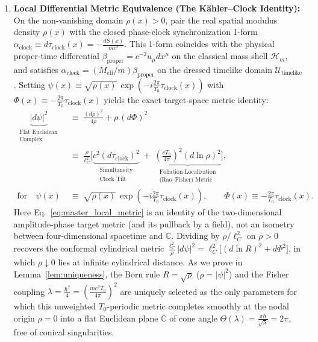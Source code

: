 \documentclass[11pt, a4paper]{article}
\theoremstyle{definition}
\begin{document}
\begin{enumerate}[label=\textbf{(\Roman*)}, leftmargin=1.2cm]
    \item \textbf{Local Differential Metric Equivalence (The K\"{a}hler--Clock Identity):} On the non-vanishing domain $\rho(x) > 0$, pair the real spatial modulus density $\rho(x)$ with the closed phase-clock synchronization 1-form $\alpha_{\text{clock}} \equiv d\tau_{\text{clock}}(x) = -\frac{dS(x)}{mc^2}$. This 1-form coincides with the physical proper-time differential $\beta_{\text{proper}} = c^{-2}u_\mu dx^\mu$ on the classical mass shell $\mathcal{H}_m$, and satisfies $\alpha_{\text{clock}} = (M_{\text{eff}}/m)\beta_{\text{proper}}$ on the dressed timelike domain $\mathcal{U}_{\text{timelike}}$. Setting $\psi(x) \equiv \sqrt{\rho(x)}\,\exp\!\left(-i\frac{2\pi}{T_0}\tau_{\text{clock}}(x)\right)$ with $\Phi(x) \equiv -\frac{2\pi}{T_0}\tau_{\text{clock}}(x)$ yields the exact target-space metric identity:
    \begin{equation}
    \label{eq:master_local_metric}
    \boxed{
    \begin{aligned}
    \underbrace{\big|d\psi\big|^2}_{\substack{\text{Flat Euclidean} \\ \text{Complex Wave Metric}}} &\;\equiv\; \frac{(d\rho)^2}{4\rho} + \rho\,(d\Phi)^2 \\
    &\;\equiv\; \frac{\rho}{\ell_C^2}\Bigg[ \underbrace{c^2 \left(d\tau_{\text{clock}}\right)^2}_{\substack{\text{Simultaneity} \\ \text{Clock Tilt}}} \;+\; \underbrace{\left(\frac{c T_0}{4\pi}\right)^{\!2} \left(d\ln\rho\right)^2}_{\substack{\text{Foliation Localization} \\ \text{(Rao--Fisher) Metric}}} \Bigg], \\
    \text{for} \quad \psi(x) &\;\equiv\; \sqrt{\rho(x)}\,\exp\!\left(-i\frac{2\pi}{T_0}\tau_{\text{clock}}(x)\right), \qquad \Phi(x) \equiv -\frac{2\pi}{T_0}\tau_{\text{clock}}(x).
    \end{aligned}
    }
    \end{equation}
    Here Eq.~\eqref{eq:master_local_metric} is an identity of the two-dimensional amplitude-phase target metric (and its pullback by a field), not an isometry between four-dimensional spacetime and $\mathbb{C}$. Dividing by $\rho/\ell_C^2$ on $\rho > 0$ recovers the conformal cylindrical metric $\frac{\ell_C^2}{\rho}|d\psi|^2 = \ell_C^2\big[(d\ln R)^2 + d\Phi^2\big]$, in which $\rho \downarrow 0$ lies at infinite cylindrical distance. As we prove in Lemma~\ref{lem:uniqueness}, the Born rule $R = \sqrt{\rho}$ ($\rho = |\psi|^2$) and the Fisher coupling $\lambda = \frac{\hbar^2}{4} = \left(\frac{mc^2 T_0}{4\pi}\right)^2$ are uniquely selected as the only parameters for which this unweighted $T_0$-periodic metric completes smoothly at the nodal origin $\rho = 0$ into a flat Euclidean plane $\mathbb{C}$ of cone angle $\Theta(\lambda) = \frac{\pi\hbar}{\sqrt{\lambda}} = 2\pi$, free of conical singularities.


\end{enumerate}
\end{document}
